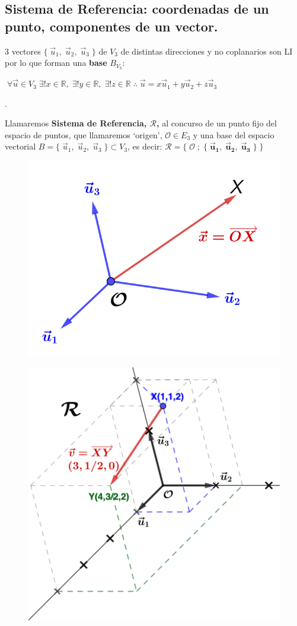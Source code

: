 \subsection{Sistema de Referencia: coordenadas de un punto, componentes de un vector.}



$3$ vectores $\{ \; \vec u_1,\; \vec u_2, \; \vec u_3 \; \}$ de $V_3$ de distintas direcciones y no coplanarios son LI por lo que forman una \textbf{base} $B_{V_3}$: 

$\; \forall \vec u \in V_3\; \exists ! x \in \mathbb R, \; \exists ! y \in \mathbb R, \; \exists ! z \in \mathbb R\; \therefore \; \vec u=x\vec u_1+y \vec u_2+z \vec u_3$

\begin{defi}.

\begin{multicols}{2}
Llamaremos \textbf{Sistema de Referencia, $\boldsymbol{\mathcal R}$,} al concurso de un punto fijo del espacio de puntos, que llamaremos `origen', $\mathcal O \in E_3$ y una base del espacio vectorial $B=\{ \; \vec u_1,\; \vec u_2, \; \vec u_3 \; \}\subset V_3$, es decir: $\boldsymbol{\mathcal R = \{\; \mathcal O\; ; \;  \{ \; \vec u_1,\; \vec u_2, \; \vec u_3 \; \} \; \}}$

	\begin{figure}[H]
	\centering
	\includegraphics[width=.50\textwidth]{imagenes/imagenes09/T09IM05.png}
	\end{figure}
\end{multicols}

\begin{multicols}{2}
\begin{figure}[H]
	\centering
	\includegraphics[width=.5\textwidth]{imagenes/imagenes09/T09IM06.png}
	\end{figure}


\end{multicols}
\end{defi}
